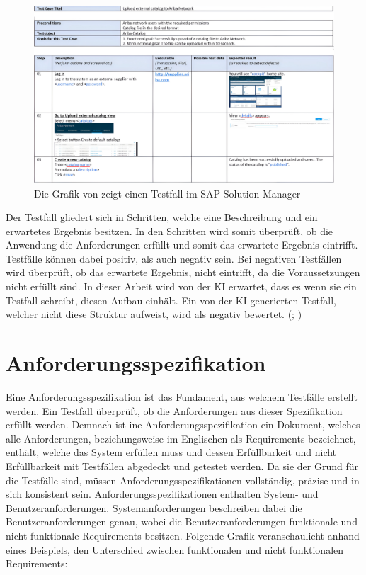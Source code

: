 \documentclass[12pt,toc=bib,toc=listof]{scrreprt}
\begin{document}
\begin{figure} [H]
    \centering
    \includegraphics[width=1\linewidth]{./Bilder/Enderli_Testfall im SAP Solution Manager.jpeg}
    \caption{Die Grafik von \textcite{Enderli2019} zeigt einen Testfall im SAP Solution Manager}
    \label{fig:enter-label}
\end{figure}
\noindent Der Testfall gliedert sich in Schritten, welche eine Beschreibung und ein erwartetes Ergebnis besitzen. In den Schritten wird somit überprüft, ob die Anwendung die Anforderungen erfüllt und somit das erwartete Ergebnis eintrifft. Testfälle können dabei positiv, als auch negativ sein. Bei negativen Testfällen wird überprüft, ob das erwartete Ergebnis, nicht eintrifft, da die Voraussetzungen nicht erfüllt sind. In dieser Arbeit wird von der KI erwartet, dass es wenn sie ein Testfall schreibt, diesen Aufbau einhält. Ein von der KI generierten Testfall, welcher nicht diese Struktur aufweist, wird als negativ bewertet. (\cite{IsoIecIeee2024}; \cite{Istqb2017})

\section{Anforderungsspezifikation} %
\label{sec:anforderungsspezifikation}
Eine Anforderungsspezifikation  ist das Fundament, aus welchem Testfälle erstellt werden. Ein Testfall überprüft, ob die Anforderungen aus dieser Spezifikation erfüllt werden. Demnach ist ine Anforderungsspezifikation ein Dokument, welches alle Anforderungen, beziehungsweise im Englischen als Requirements bezeichnet, enthält, welche das System erfüllen muss und dessen Erfüllbarkeit und nicht Erfüllbarkeit mit Testfällen abgedeckt und getestet werden. Da sie der Grund für die Testfälle sind, müssen Anforderungsspezifikationen vollständig, präzise und in sich konsistent sein. Anforderungsspezifikationen enthalten System- und Benutzeranforderungen. Systemanforderungen beschreiben dabei die Benutzeranforderungen genau, wobei die Benutzeranforderungen funktionale und nicht funktionale Requirements besitzen. Folgende Grafik veranschaulicht anhand eines Beispiels, den Unterschied zwischen funktionalen und nicht funktionalen Requirements:
\end{document}
